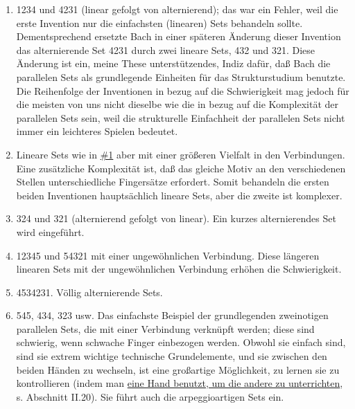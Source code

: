 \begin{enumerate}[label={\arabic*.}] 

 \item \hypertarget{c1iii20ps01}{}

1234 und 4231 (linear gefolgt von alternierend); das war ein Fehler, weil die erste Invention nur die einfachsten (linearen) Sets behandeln sollte.
Dementsprechend ersetzte Bach in einer späteren Änderung dieser Invention das alternierende Set 4231 durch zwei lineare Sets, 432 und 321.
Diese Änderung ist ein, meine These unterstützendes, Indiz dafür, daß Bach die parallelen Sets als grundlegende Einheiten für das Strukturstudium benutzte.
Die Reihenfolge der Inventionen in bezug auf die Schwierigkeit mag jedoch für die meisten von uns nicht dieselbe wie die in bezug auf die Komplexität der parallelen Sets sein, weil die strukturelle Einfachheit der parallelen Sets nicht immer ein leichteres Spielen bedeutet.

 \item \hypertarget{c1iii20ps02}{}

Lineare Sets wie in \hyperref[c1iii20ps01]{\#1} aber mit einer größeren Vielfalt in den Verbindungen.
Eine zusätzliche Komplexität ist, daß das gleiche Motiv an den verschiedenen Stellen unterschiedliche Fingersätze erfordert.
Somit behandeln die ersten beiden Inventionen hauptsächlich lineare Sets, aber die zweite ist komplexer.

 \item \hypertarget{c1iii20ps03}{}

324 und 321 (alternierend gefolgt von linear).
Ein kurzes alternierendes Set wird eingeführt.

 \item \hypertarget{c1iii20ps04}{}

12345 und 54321 mit einer ungewöhnlichen Verbindung.
Diese längeren linearen Sets mit der ungewöhnlichen Verbindung erhöhen die Schwierigkeit.

 \item \hypertarget{c1iii20ps05}{}

4534231.
Völlig alternierende Sets.

 \item \hypertarget{c1iii20ps06}{}

545, 434, 323 usw.
Das einfachste Beispiel der grundlegenden zweinotigen parallelen Sets, die mit einer Verbindung verknüpft werden; diese sind schwierig, wenn schwache Finger einbezogen werden.
Obwohl sie einfach sind, sind sie extrem wichtige technische Grundelemente, und sie zwischen den beiden Händen zu wechseln, ist eine großartige Möglichkeit, zu lernen sie zu kontrollieren (indem man \hyperref[c1ii20]{eine Hand benutzt, um die andere zu unterrichten}, s. Abschnitt II.20).
Sie führt auch die arpeggioartigen Sets ein.


\end{enumerate}
